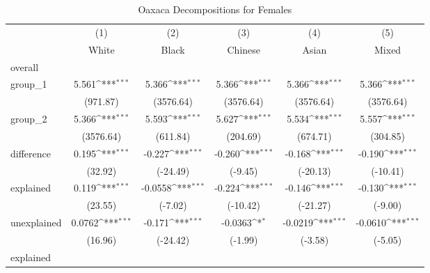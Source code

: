 \begin{table}[htbp]\centering
\def\sym#1{\ifmmode^{#1}\else\(^{#1}\)\fi}
\caption{Oaxaca Decompositions for Females\label{tab1}}
\begin{tabular}{l*{5}{c}}
\hline\hline
            &\multicolumn{1}{c}{(1)}&\multicolumn{1}{c}{(2)}&\multicolumn{1}{c}{(3)}&\multicolumn{1}{c}{(4)}&\multicolumn{1}{c}{(5)}\\
            &\multicolumn{1}{c}{White}&\multicolumn{1}{c}{Black}&\multicolumn{1}{c}{Chinese}&\multicolumn{1}{c}{Asian}&\multicolumn{1}{c}{Mixed}\\
\hline
overall     &                     &                     &                     &                     &                     \\
group\_1     &       5.561\sym{***}&       5.366\sym{***}&       5.366\sym{***}&       5.366\sym{***}&       5.366\sym{***}\\
            &    (971.87)         &   (3576.64)         &   (3576.64)         &   (3576.64)         &   (3576.64)         \\
group\_2     &       5.366\sym{***}&       5.593\sym{***}&       5.627\sym{***}&       5.534\sym{***}&       5.557\sym{***}\\
            &   (3576.64)         &    (611.84)         &    (204.69)         &    (674.71)         &    (304.85)         \\
difference  &       0.195\sym{***}&      -0.227\sym{***}&      -0.260\sym{***}&      -0.168\sym{***}&      -0.190\sym{***}\\
            &     (32.92)         &    (-24.49)         &     (-9.45)         &    (-20.13)         &    (-10.41)         \\
explained   &       0.119\sym{***}&     -0.0558\sym{***}&      -0.224\sym{***}&      -0.146\sym{***}&      -0.130\sym{***}\\
            &     (23.55)         &     (-7.02)         &    (-10.42)         &    (-21.27)         &     (-9.00)         \\
unexplained &      0.0762\sym{***}&      -0.171\sym{***}&     -0.0363\sym{*}  &     -0.0219\sym{***}&     -0.0610\sym{***}\\
            &     (16.96)         &    (-24.42)         &     (-1.99)         &     (-3.58)         &     (-5.05)         \\
\hline
explained   &                     &                     &                     &                     &                     \\

\end{tabular}
\end{table}
